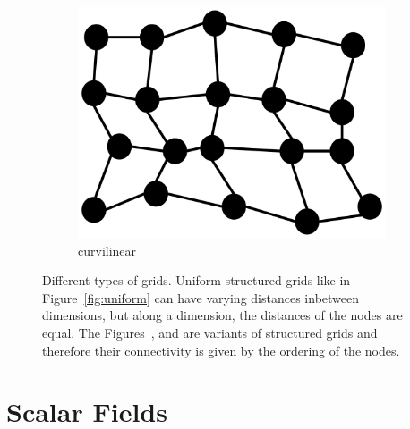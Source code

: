 \begin{figure}
\begin{subfigure}[b]{0.19\textwidth}
    \includegraphics[width=\textwidth]{Images/curvilinear.pdf}
    \caption{curvilinear}
    \label{fig:curvilinear}
  \end{subfigure}
  \caption{Different types of grids. Uniform structured grids like in
  Figure~\ref{fig:uniform} can have varying distances inbetween
  dimensions, but along a dimension, the distances of the nodes are
  equal. The Figures~,  and
   are variants of structured grids and
  therefore their connectivity is given by the ordering of the nodes.}
  \label{fig:grids}
\end{figure}

\section{Scalar Fields}

